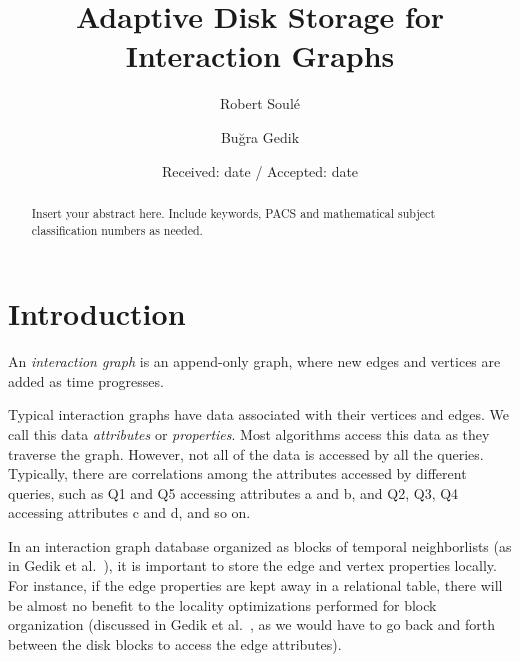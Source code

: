 \documentclass[twocolumn]{svjour3}          %
\begin{document}
\title{Adaptive Disk Storage for Interaction Graphs}


\author{Robert Soul\'{e}         \and
        Bu\u{g}ra Gedik%
}



\date{Received: date / Accepted: date}


\maketitle

\begin{abstract}
Insert your abstract here. Include keywords, PACS and mathematical
subject classification numbers as needed.
\end{abstract}



\section{Introduction}
An \emph{interaction graph} is an append-only graph, where new edges and
vertices are added as time progresses.%

Typical interaction graphs have data associated with their vertices and edges.
We call this data \emph{attributes} or \emph{properties}. Most algorithms
access this data as they traverse the graph. However, not all of the data is
accessed by all the queries. Typically, there are correlations among the
attributes accessed by different queries, such as Q1 and Q5 accessing
attributes a and b, and Q2, Q3, Q4 accessing attributes c and d, and so on.%

In an interaction graph database organized as blocks of temporal neighborlists
(as in Gedik et al.~\cite{gedik14}), it is important to store the edge and
vertex properties locally. For  instance, if the edge properties are kept away
in a relational table, there will be almost no benefit to the locality
optimizations performed for block organization (discussed in Gedik et
al.~\cite{gedik14}, as we would have to go back and forth between the disk
blocks to access the edge attributes).%
\end{document}

